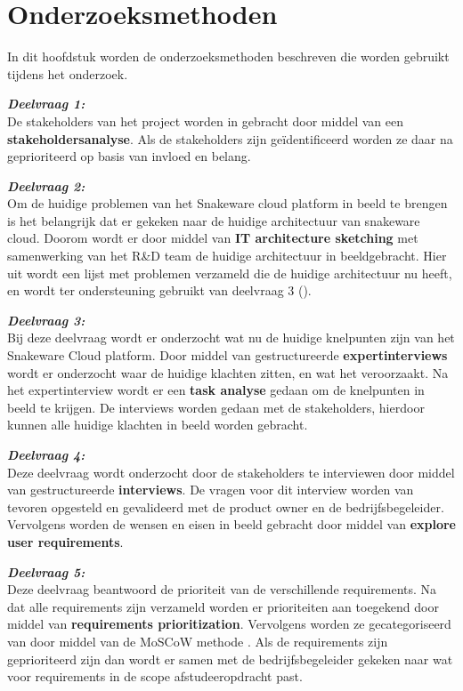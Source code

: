 \section{Onderzoeksmethoden}
In dit hoofdstuk worden de onderzoeksmethoden beschreven die worden gebruikt tijdens het onderzoek.

\whitespace[2]
\textit{\textbf{Deelvraag 1:} \SubquestionOne} \\
De stakeholders van het project worden in gebracht door middel van een \textbf{stakeholdersanalyse}.
Als de stakeholders zijn geïdentificeerd worden ze daar na geprioriteerd op basis van invloed en belang.

\whitespace[2]
\textit{\textbf{Deelvraag 2:} \SubquestionTwo} \\
Om de huidige problemen van het Snakeware cloud platform in beeld te brengen is het belangrijk dat er gekeken naar de huidige architectuur van snakeware cloud.
Doorom wordt er door middel van \textbf{IT architecture sketching} met samenwerking van het R\&D team de huidige architectuur in beeldgebracht.
Hier uit wordt een lijst met problemen verzameld die de huidige architectuur nu heeft, en wordt ter ondersteuning gebruikt van deelvraag 3 (\textit{\SubquestionThree}).

\whitespace[2]
\textit{\textbf{Deelvraag 3:} \SubquestionThree} \\
Bij deze deelvraag wordt er onderzocht wat nu de huidige knelpunten zijn van het Snakeware Cloud platform.
Door middel van gestructureerde \textbf{expertinterviews} wordt er onderzocht waar de huidige klachten zitten, en wat het veroorzaakt.
Na het expertinterview wordt er een \textbf{task analyse} gedaan om de knelpunten in beeld te krijgen.
De interviews worden gedaan met de stakeholders, hierdoor kunnen alle huidige klachten in beeld worden gebracht.

\whitespace[2]
\textit{\textbf{Deelvraag 4:} \SubquestionFour} \\
Deze deelvraag wordt onderzocht door de stakeholders te interviewen door middel van gestructureerde \textbf{interviews}. 
De vragen voor dit interview worden van tevoren opgesteld en gevalideerd met de product owner en de bedrijfsbegeleider.
Vervolgens worden de wensen en eisen in beeld gebracht door middel van \textbf{explore user requirements}.

\whitespace[2]
\textit{\textbf{Deelvraag 5:} \SubquestionFive} \\
Deze deelvraag beantwoord de prioriteit van de verschillende requirements.
Na dat alle requirements zijn verzameld worden er prioriteiten aan toegekend door middel van \textbf{requirements prioritization}.
Vervolgens worden ze  gecategoriseerd van door middel van de MoSCoW methode \Parencite{MoSCoW}. 
Als de requirements zijn geprioriteerd zijn dan wordt er samen met de bedrijfsbegeleider gekeken naar wat voor requirements in de scope afstudeeropdracht past.
